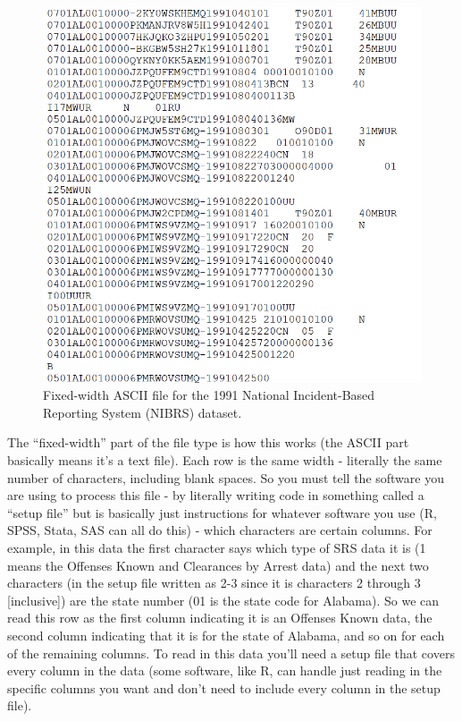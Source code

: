 \documentclass[
  12pt,
  openany]{book}
\begin{document}
\begin{figure}

{\centering \includegraphics[width=0.9\linewidth]{images/nibrs_ascii} 

}

\caption{Fixed-width ASCII file for the 1991 National Incident-Based Reporting System (NIBRS) dataset.}\label{fig:ascii}
\end{figure}

The ``fixed-width'' part of the file type is how this works (the ASCII part basically means it's a text file). Each row is the same width - literally the same number of characters, including blank spaces. So you must tell the software you are using to process this file - by literally writing code in something called a ``setup file'' but is basically just instructions for whatever software you use (R, SPSS, Stata, SAS can all do this) - which characters are certain columns. For example, in this data the first character says which type of SRS data it is (1 means the Offenses Known and Clearances by Arrest data) and the next two characters (in the setup file written as 2-3 since it is characters 2 through 3 {[}inclusive{]}) are the state number (01 is the state code for Alabama). So we can read this row as the first column indicating it is an Offenses Known data, the second column indicating that it is for the state of Alabama, and so on for each of the remaining columns. To read in this data you'll need a setup file that covers every column in the data (some software, like R, can handle just reading in the specific columns you want and don't need to include every column in the setup file).
\end{document}
